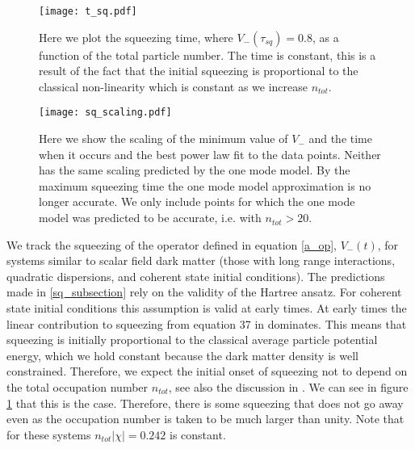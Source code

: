\documentclass[aps,prd,twocolumn,superscriptaddress]{revtex4-1}
\begin{document}
\begin{figure}
	\texttt{[image: t\_sq.pdf]}
	\caption{ Here we plot the squeezing time, where $V_-(\tau_{sq}) = 0.8$, as a function of the total particle number. The time is constant, this is a result of the fact that the initial squeezing is proportional to the classical non-linearity which is constant as we increase $n_{tot}$.}
	\label{fig:t_sq}
\end{figure}

\begin{figure}
	\texttt{[image: sq\_scaling.pdf]}
	\caption{ Here we show the scaling of the minimum value of $V_-$ and the time when it occurs and the best power law fit to the data points. Neither has the same scaling predicted by the one mode model. By the maximum squeezing time the one mode model approximation is no longer accurate. We only include points for which the one mode model was predicted to be accurate, i.e. with $n_{tot} > 20$. }
	\label{fig:sq_scaling}
\end{figure}

We track the squeezing of the operator defined in equation \eqref{a_op}, $V_-(t)$, for systems similar to scalar field dark matter (those with long range interactions, quadratic dispersions, and coherent state initial conditions). The predictions made in \ref{sq_subsection} rely on the validity of the Hartree ansatz. For coherent state initial conditions this assumption is valid at early times. At early times the linear contribution to squeezing from equation 37 in \cite{Eberhardt2021} dominates. This means that squeezing is initially proportional to the classical average particle potential energy, which we hold constant because the dark matter density is well constrained. Therefore, we expect the initial onset of squeezing not to depend on the total occupation number $n_{tot}$, see also the discussion in \cite{KoppFragkosPikovski2021}. We can see in figure \ref{fig:t_sq} that this is the case. Therefore, there is some squeezing that does not go away even as the occupation number is taken to be much larger than unity. Note that for these systems $n_{tot} |\chi| = 0.242$ is constant.
\end{document}

